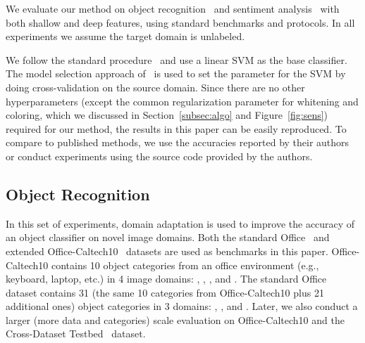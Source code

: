 \documentclass[letterpaper]{article}
\begin{document}
We evaluate our method on object recognition~\cite{saenko2010adapting} and sentiment analysis~\cite{Blitzer07Biographies} with both shallow and deep features, using standard benchmarks and protocols. In all experiments we assume the target domain is unlabeled. 

We follow the standard procedure~\cite{sasb,decaf} and use a linear SVM as the base classifier. The model selection approach of~\cite{sasb} is used to set the  parameter for the SVM by doing cross-validation on the source domain. Since there are no other hyperparameters (except the common regularization parameter  for whitening and coloring, which we discussed in Section~\ref{subsec:algo} and Figure~\ref{fig:sens}) required for our method, the results in this paper can be easily reproduced. To compare to published methods, we use the accuracies reported by their authors or conduct experiments using the source code provided by the authors. 

\subsection{Object Recognition}
\label{subsec:recog}
In this set of experiments, domain adaptation is used to improve the accuracy of an object classifier on novel image domains.
Both the standard Office~\cite{saenko2010adapting} and extended Office-Caltech10~\cite{gfk} datasets are used as benchmarks in this paper. Office-Caltech10 contains 10 object categories from an office environment (e.g., keyboard, laptop, etc.) in 4 image domains: , , , and . The standard Office dataset contains 31 (the same 10 categories from Office-Caltech10 plus 21 additional ones) object categories in 3 domains: , , and . Later, we also conduct a larger (more data and categories) scale evaluation on Office-Caltech10 and the Cross-Dataset Testbed~\cite{cross_dataset} dataset. 
\end{document}
